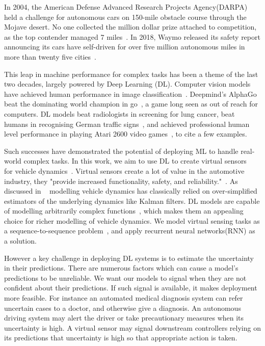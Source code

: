 \documentclass[../main.tex]{subfiles}
\begin{document}
In 2004, the American Defense Advanced Research Projects Agency(DARPA) held a challenge for autonomous cars on 150-mile obstacle course through the Mojave desert. No one collected the million dollar prize attached to competition, as the top contender managed 7 miles~\citep{darpa2004}. In 2018, Waymo released its safety report announcing its cars have self-driven for over five million autonomous miles in more than twenty five cities~\citep{waymo2018safety}.  

This leap in machine performance for complex tasks has been a theme of the last two decades, largely powered by Deep Learning (DL). Computer vision models have achieved human performance in image classification~\citep{he2015delving}. Deepmind's AlphaGo beat the dominating world champion in go~\citep{silver2017mastering}, a game long seen as out of reach for computers. DL models beat radiologists in screening for lung cancer\citep{ardila2019end}, beat humans in recognising German traffic signs~\citep{cirecsan2012multi}, and achieved professional human level performance in playing Atari 2600 video games~\citep{mnih2015human}, to cite a few examples.

Such successes have demonstrated the potential of deploying ML to handle real-world complex tasks. In this work, we aim to use DL to create virtual sensors~\citep{li2011review} for vehicle dynamics~\citep{schramm2014vehicle}. Virtual sensors create a lot of value in the automotive industry, they "provide increased functionality, safety, and reliability."~\citep{li2011review}. As discussed in ~\citep{graber2018hybrid} modelling vehicle dynamics has classically relied on over-simplified estimators of the underlying dynamics like Kalman filters. DL models are capable of modelling arbitrarily complex functions~\citep{goodfellow2016deep}, which makes them an appealing choice for richer  modelling of vehicle dynamics\citep{graber2018hybrid}. We model virtual sensing tasks as a sequence-to-sequence problem~\citep{goodfellow2016deep}, and apply recurrent neural networks(RNN) as a solution.

However a key challenge in deploying DL systems is to estimate the uncertainty in their predictions. There are numerous factors which can cause a model's predictions to be unreliable. We want our models to signal when they are not confident about their predictions. If such signal is available, it makes deployment more feasible. For instance an automated medical diagnosis system can refer uncertain cases to a doctor, and otherwise give a diagnosis. An autonomous driving system may alert the driver or take precautionary measures when its uncertainty is high. A virtual sensor may signal downstream controllers relying on its predictions that uncertainty is high so that appropriate action is taken. 
\end{document}
